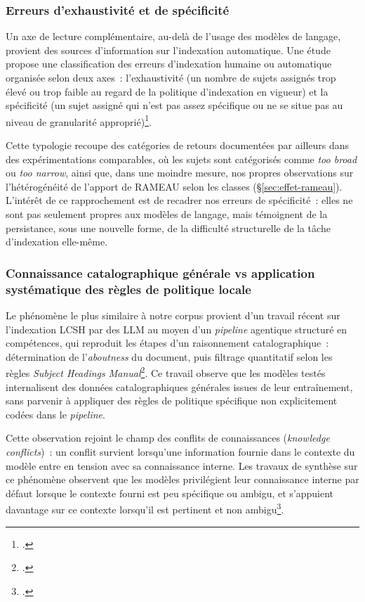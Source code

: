 \subsubsection*{Erreurs d'exhaustivité et de spécificité}

Un axe de lecture complémentaire, au-delà de l'usage des modèles de langage, provient des sources d'information sur l'indexation automatique. Une étude propose une classification des erreurs d'indexation humaine ou automatique organisée selon deux axes~: l'exhaustivité (un nombre de sujets assignés trop élevé ou trop faible au regard de la politique d'indexation en vigueur) et la spécificité (un sujet assigné qui n'est pas assez spécifique ou ne se situe pas au niveau de granularité approprié)\footcite{golub2021}.

Cette typologie recoupe des catégories de retours documentées par ailleurs dans des expérimentations comparables, où les sujets sont catégorisés comme \textit{too broad} ou \textit{too narrow}, ainsi que, dans une moindre mesure, nos propres observations sur l'hétérogénéité de l'apport de RAMEAU selon les classes (\S\ref{sec:effet-rameau}). L'intérêt de ce rapprochement est de recadrer nos erreurs de spécificité~: elles ne sont pas seulement propres aux modèles de langage, mais témoignent de la persistance, sous une nouvelle forme, de la difficulté structurelle de la tâche d'indexation elle-même.

\subsubsection*{Connaissance catalographique générale vs application systématique des règles de politique locale}

Le phénomène le plus similaire à notre corpus provient d'un travail récent sur l'indexation LCSH par des LLM au moyen d'un \textit{pipeline} agentique structuré en compétences, qui reproduit les étapes d'un raisonnement catalographique~: détermination de l'\textit{aboutness} du document, puis filtrage quantitatif selon les règles \textit{Subject Headings Manual}\footcite{chow2026}. Ce travail observe que les modèles testés internalisent des données catalographiques générales issues de leur entraînement, sans parvenir à appliquer des règles de politique spécifique non explicitement codées dans le \textit{pipeline}.

Cette observation rejoint le champ des conflits de connaissances (\textit{knowledge conflicts})~: un conflit survient lorsqu'une information fournie dans le contexte du modèle entre en tension avec sa connaissance interne. Les travaux de synthèse sur ce phénomène observent que les modèles privilégient leur connaissance interne par défaut lorsque le contexte fourni est peu spécifique ou ambigu, et s'appuient davantage sur ce contexte lorsqu'il est pertinent et non ambigu\footcite{xu2024}.

